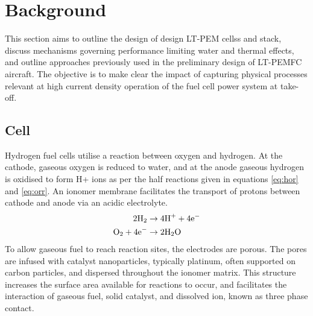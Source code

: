 \section{Background} \label{sec:background}
This section aims to outline the design of design LT-PEM cellss and stack, discuss mechanisms governing performance limiting water and thermal effects, and outline approaches previously used in the preliminary design of LT-PEMFC aircraft. The objective is to make clear the impact of capturing physical processes relevant at high current density operation of the fuel cell power system at take-off.

\subsection{Cell}
Hydrogen fuel cells utilise a reaction between oxygen and hydrogen. At the cathode, gaseous oxygen is reduced to water, and at the anode gaseous hydrogen is oxidised to form H+ ions as per the half reactions given in equations \ref{eq:hor} and \ref{eq:orr}. An ionomer membrane facilitates the transport of protons between cathode and anode via an acidic electrolyte.
\begin{align}
	2\text{H}_2             & \rightarrow 4 \text{H}^+ + 4 \text{e}^- \label{eq:hor} \\
	\text{O}_2 + 4\text{e}^- & \rightarrow 2\text{H}_2\text{O} \label{eq:orr}
\end{align}
To allow gaseous fuel to reach reaction sites, the electrodes are porous. The pores are infused with catalyst nanoparticles, typically platinum, often supported on carbon particles, and dispersed throughout the ionomer matrix. This structure increases the surface area available for reactions to occur, and facilitates the interaction of gaseous fuel, solid catalyst, and dissolved ion, known as three phase contact.
%

